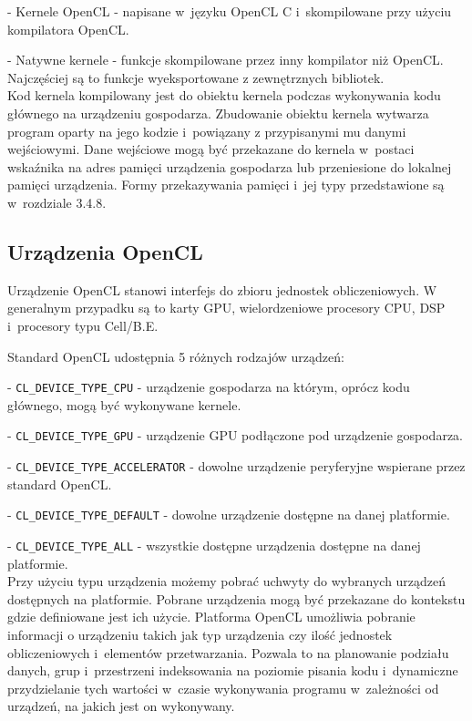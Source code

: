 - Kernele OpenCL - napisane w~języku OpenCL C i~skompilowane przy użyciu kompilatora OpenCL.

- Natywne kernele - funkcje skompilowane przez inny kompilator niż OpenCL. Najczęściej są to funkcje wyeksportowane z zewnętrznych bibliotek.\\

Kod kernela kompilowany jest do obiektu kernela podczas wykonywania kodu głównego na urządzeniu gospodarza. Zbudowanie obiektu kernela wytwarza program oparty na jego kodzie i~powiązany z przypisanymi mu danymi wejściowymi. Dane wejściowe mogą być przekazane do kernela w~postaci wskaźnika na adres pamięci urządzenia gospodarza lub przeniesione do lokalnej pamięci urządzenia. Formy przekazywania pamięci i~jej typy przedstawione są w~rozdziale 3.4.8.

\subsection{Urządzenia OpenCL}\label{sec:OpenC21L}

Urządzenie OpenCL stanowi interfejs do zbioru jednostek obliczeniowych. W generalnym przypadku są to karty GPU, wielordzeniowe procesory CPU, DSP i~procesory typu Cell/B.E.

Standard OpenCL udostępnia 5 różnych rodzajów urządzeń:

- \verb|CL_DEVICE_TYPE_CPU| - urządzenie gospodarza na którym, oprócz kodu głównego, mogą być wykonywane kernele.

- \verb|CL_DEVICE_TYPE_GPU| - urządzenie GPU podłączone pod urządzenie gospodarza.

- \verb|CL_DEVICE_TYPE_ACCELERATOR| - dowolne urządzenie peryferyjne wspierane przez standard OpenCL.

- \verb|CL_DEVICE_TYPE_DEFAULT| - dowolne urządzenie dostępne na danej platformie.

- \verb|CL_DEVICE_TYPE_ALL| - wszystkie dostępne urządzenia dostępne na danej platformie.\\

Przy użyciu typu urządzenia możemy pobrać uchwyty do wybranych urządzeń dostępnych na platformie. Pobrane urządzenia mogą być przekazane do kontekstu gdzie definiowane jest ich użycie. Platforma OpenCL umożliwia pobranie informacji o urządzeniu takich jak typ urządzenia czy ilość jednostek obliczeniowych i~elementów przetwarzania. Pozwala to na planowanie podziału danych, grup i~przestrzeni indeksowania na poziomie pisania kodu i~dynamiczne przydzielanie tych wartości w~czasie wykonywania programu w~zależności od urządzeń, na jakich jest on wykonywany.
 
